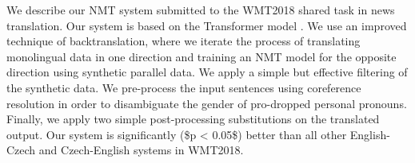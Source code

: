 We describe our NMT system submitted to the WMT2018 shared task in news translation. Our system is based on the Transformer model \citep{vaswani-et-al:2017}. We use an improved technique of backtranslation, where we iterate the process of translating monolingual data in one direction and training an NMT model for the opposite direction using synthetic parallel data. We apply a simple but effective filtering of the synthetic data. We pre-process the input sentences using coreference resolution in order to disambiguate the gender of pro-dropped personal pronouns. Finally, we apply two simple post-processing substitutions on the translated output. Our system is significantly (\$p < 0.05\$) better than all other English-Czech and Czech-English systems in WMT2018.
